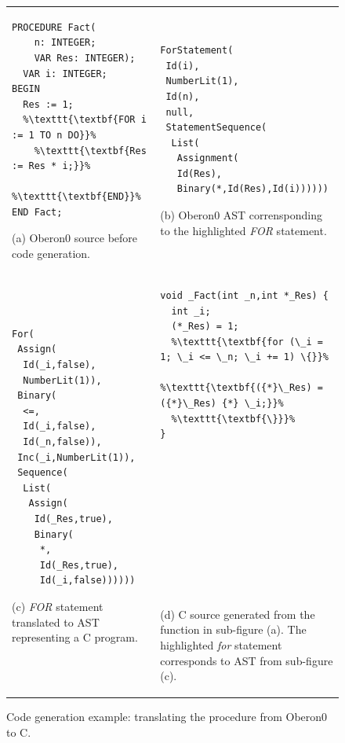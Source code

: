 \begin{figure}[!h]
\begin{tabular}{>{\raggedright}p{}>{\centering}p{}}
\begin{lstlisting}[basicstyle={\footnotesize\ttfamily},escapechar={\%}]
PROCEDURE Fact(
    n: INTEGER;
    VAR Res: INTEGER);
  VAR i: INTEGER;
BEGIN
  Res := 1;
  %\texttt{\textbf{FOR i := 1 TO n DO}}%
    %\texttt{\textbf{Res := Res * i;}}%
  %\texttt{\textbf{END}}%
END Fact;
\end{lstlisting}


(a) Oberon0 source before code generation. & 
\begin{lstlisting}[basicstyle={\footnotesize\ttfamily}]
ForStatement(
 Id(i),
 NumberLit(1),
 Id(n),
 null,
 StatementSequence(
  List(
   Assignment(
   Id(Res),
   Binary(*,Id(Res),Id(i))))))
\end{lstlisting}


(b) Oberon0 AST corrensponding to the highlighted \emph{FOR} statement.\tabularnewline
\begin{lstlisting}[basicstyle={\footnotesize\ttfamily}]
For(
 Assign(
  Id(_i,false),
  NumberLit(1)),
 Binary(
  <=,
  Id(_i,false),
  Id(_n,false)),
 Inc(_i,NumberLit(1)),
 Sequence(
  List(
   Assign(
    Id(_Res,true),
    Binary(
     *,
     Id(_Res,true),
     Id(_i,false))))))
\end{lstlisting}


(c) \emph{FOR} statement translated to AST representing a C program. & 
\begin{lstlisting}[basicstyle={\footnotesize\ttfamily},escapechar={\%},showlines=true]
void _Fact(int _n,int *_Res) {
  int _i;
  (*_Res) = 1;
  %\texttt{\textbf{for (\_i = 1; \_i <= \_n; \_i += 1) \{}}%
    %\texttt{\textbf{({*}\_Res) = ({*}\_Res) {*} \_i;}}%
  %\texttt{\textbf{\}}}%
}
 
 
 
 
 
 
 
 
 
 
\end{lstlisting}


(d) C source generated from the function in sub-figure (a). The highlighted
\emph{for} statement corresponds to AST from sub-figure (c).\tabularnewline
\end{tabular}

\caption{\label{fig:code-generation}Code generation example: translating the
procedure from Oberon0 to C.}
\end{figure}



